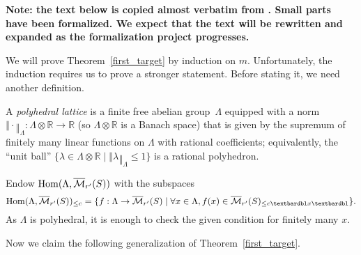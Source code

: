 \begin{remark}
  \label{boundary-text}
  \textbf{Note: the text below is copied almost verbatim from \cite{Analytic}.
  Small parts have been formalized.
  We expect that the text will be rewritten and expanded as the formalization project progresses.}
\end{remark}




We will prove Theorem~\ref{first_target} by induction on $m$.
Unfortunately, the induction requires us to prove a stronger statement.
Before stating it, we need another definition.

\begin{definition}
  \label{polyhedral_lattice}
  A \emph{polyhedral lattice} is a finite free abelian group~$\Lambda$
  equipped with a norm $‖\cdot‖_\Lambda \colon \Lambda\otimes \mathbb R\to \mathbb R$
  (so $\Lambda\otimes \mathbb R$ is a Banach space)
  that is given by the supremum of finitely many linear functions on $\Lambda$ with rational coefficients;
  equivalently, the ``unit ball''
  $\{\lambda\in \Lambda\otimes \mathbb R\mid ‖\lambda‖_\Lambda\leq 1\}$ is a rational polyhedron.
\end{definition}

Endow $\operatorname{Hom}(\Lambda,\overline{\mathcal M}_{r'}(S))$ with the subspaces
\[
\Hom(\Lambda,\overline{\mathcal M}_{r'}(S))_{\leq c} = \{f: \Lambda\to \overline{\mathcal M}_{r'}(S)\mid \forall x\in \Lambda, f(x)\in \overline{\mathcal M}_{r'}(S)_{\leq c‖x‖}\}.
\]
As $\Lambda$ is polyhedral, it is enough to check the given condition for finitely many $x$.

Now we claim the following generalization of Theorem~\ref{first_target}.

